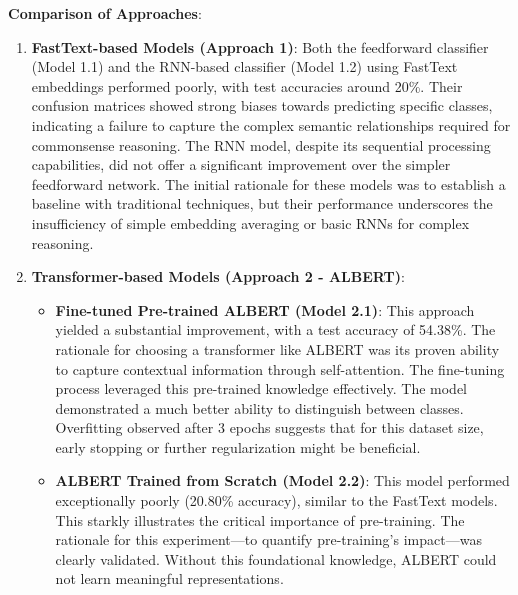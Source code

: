 \documentclass[10.5pt]{article}
\begin{document}
\textbf{Comparison of Approaches}:
\begin{enumerate}
    \item \textbf{FastText-based Models (Approach 1)}: Both the feedforward classifier (Model 1.1) and the RNN-based classifier (Model 1.2) using FastText embeddings performed poorly, with test accuracies around 20\%. Their confusion matrices showed strong biases towards predicting specific classes, indicating a failure to capture the complex semantic relationships required for commonsense reasoning. The RNN model, despite its sequential processing capabilities, did not offer a significant improvement over the simpler feedforward network. The initial rationale for these models was to establish a baseline with traditional techniques, but their performance underscores the insufficiency of simple embedding averaging or basic RNNs for complex reasoning.
    
    \item \textbf{Transformer-based Models (Approach 2 - ALBERT)}:
        \begin{itemize}
            \item \textbf{Fine-tuned Pre-trained ALBERT (Model 2.1)}: This approach yielded a substantial improvement, with a test accuracy of 54.38\%. The rationale for choosing a transformer like ALBERT was its proven ability to capture contextual information through self-attention. The fine-tuning process leveraged this pre-trained knowledge effectively. The model demonstrated a much better ability to distinguish between classes. Overfitting observed after 3 epochs suggests that for this dataset size, early stopping or further regularization might be beneficial.
            \item \textbf{ALBERT Trained from Scratch (Model 2.2)}: This model performed exceptionally poorly (20.80\% accuracy), similar to the FastText models. This starkly illustrates the critical importance of pre-training. The rationale for this experiment—to quantify pre-training's impact—was clearly validated. Without this foundational knowledge, ALBERT could not learn meaningful representations.
        \end{itemize}


\end{enumerate}
\end{document}
